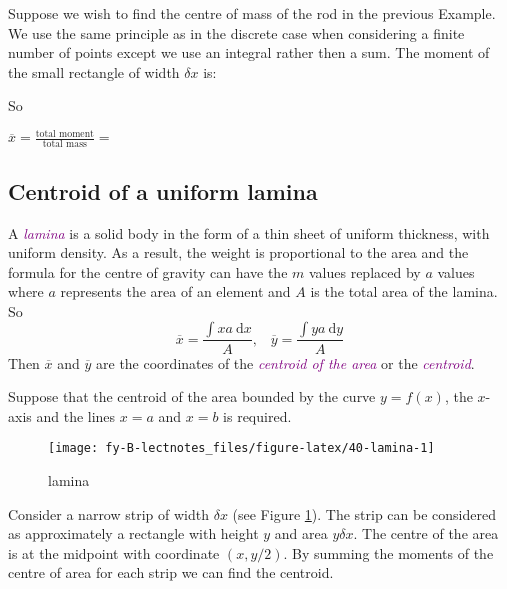 \documentclass[
  english,
  11pt,
  oneside]{book}
\newcommand{\slide}{}
\theoremstyle{definition}
\theoremstyle{definition}
\theoremstyle{definition}
\theoremstyle{definition}
\theoremstyle{remark}
\begin{document}
\begin{slidesonly}

Suppose we wish to find the centre of mass of the rod in the previous Example. We use the same principle as in the discrete case when considering a finite number of points except we use an integral rather then a sum. The moment of the small rectangle of width \(\delta x\) is:

So

\(\overline x = \displaystyle\frac{\text{total moment}}{\text{total mass}} =\)

\end{slidesonly}

\slide

\subsection{Centroid of a uniform lamina}\label{centroid-of-a-uniform-lamina}

A \textcolor{purple}{\em lamina} is a solid body in the form of a thin sheet of uniform thickness, with uniform density. As a result, the weight is proportional to the area and the formula for the centre of gravity can have the \(m\) values replaced by \(a\) values where \(a\) represents the area of an element and \(A\) is the total area of the lamina. So
\[
\overline x = \frac{\displaystyle\int xa\ \mathrm{d}x}{A},\;\;\; \overline y = \frac{\displaystyle\int ya\ \mathrm{d}y}{A}
\]
Then \(\overline x\) and \(\overline y\) are the coordinates of the \textcolor{purple}{\em centroid of the area} or the \textcolor{purple}{\em centroid}.

\slide

Suppose that the centroid of the area bounded by the curve \(y=f(x)\), the \(x\)-axis and the lines \(x=a\) and \(x=b\) is required.

\begin{figure}

{\centering \texttt{[image: fy-B-lectnotes\_files/figure-latex/40-lamina-1]} 

}

\caption{lamina}\label{fig:40-lamina}
\end{figure}

Consider a narrow strip of width \(\delta x\) (see Figure \ref{fig:40-lamina}). The strip can be considered as approximately a rectangle with height \(y\) and area \(y\delta x\). The centre of the area is at the midpoint with coordinate \((x,y/2)\). By summing the moments of the centre of area for each strip we can find the centroid.
\end{document}
